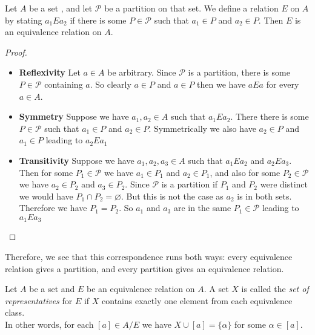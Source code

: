 \documentclass[16pt,a4paper]{article}
\theoremstyle{definition}
\begin{document}
\begin{thm}{}{}
Let $A$ be a set , and let $\mathcal{P}$ be a partition on that set. We define a relation $E$ on $A$ by stating $a_1 E a_2$ if there is some $P \in \mathcal{P}$ such that $a_1 \in P$ and $a_2 \in P$. Then $E$ is an equivalence relation on $A$. 
\end{thm}
\begin{proof}
$\;$\\
\begin{itemize}
\item \textbf{Reflexivity} Let $a\in A$ be arbitrary. Since $\mathcal{P}$ is a partition, there is some $P \in \mathcal{P}$ containing $a$. So clearly $a\in P$ and $a\in P$ then we have $aEa$ for every $a\in A$. 

\item \textbf{Symmetry} Suppose we have $a_1, a_2 \in A$ such that $a_1 E a_2$. There there is some $P \in \mathcal{P}$ such that $a_1 \in P$ and $a_2 \in P$. Symmetrically we also have $a_2 \in P$ and $a_1 \in P$ leading to $a_2 E a_1$

\item \textbf{Transitivity} Suppose we have $a_1, a_2, a_3 \in A$ such that $a_1Ea_2$ and $a_2Ea_3$. Then for some $P_1\in\mathcal{P}$ we have $a_1 \in P_1$ and $a_2 \in P_1$, and also for some $P_2 \in \mathcal{P}$ we have $a_2 \in P_2$ and $a_3 \in P_2$. Since $\mathcal{P}$ is a partition if $P_1$ and $P_2$ were distinct we would have $P_1 \cap P_2 = \varnothing$. But this is not the case as $a_2$ is in both sets. Therefore we have $P_1 = P_2$. So $a_1$ and $a_3$ are in the same $P_1 \in \mathcal{P}$ leading to $a_1 E a_3$ 

\end{itemize}
\end{proof} 
\newpage
Therefore, we see that this correspondence runs both ways: every equivalence relation gives a partition, and every partition gives an equivalence relation.


\begin{defn}{}{}
Let $A$ be a set and $E$ be an equivalence relation on $A$.  A set $X$ is called the \textit{set of representatives} for $E$ if $X$ contains exactly one element from each equivalence class. \\
In other words, for each $[a] \in A/E$ we have $X\cup [a] = \{\alpha\}$ for some $\alpha \in [a]$. 
\end{defn}
\end{document}
